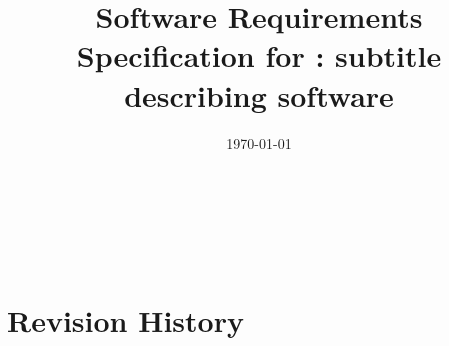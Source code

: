 \documentclass[12pt]{article}
\begin{document}

\title{Software Requirements Specification for \progname: subtitle
describing software}
\author{\authname}
\date{\today}

\maketitle
\thispagestyle{empty}

~\newpage

\tableofcontents

~\newpage

\section*{Revision History}
\end{document}
